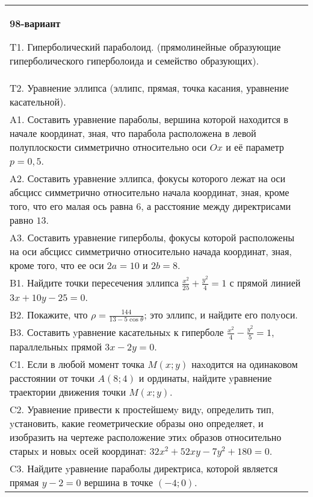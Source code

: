 \documentclass{article}
\begin{document}
\begin{tabular}{m{17cm}}
\textbf{98-вариант}
\newline

T1. Гиперболический параболоид. (прямолинейные образующие гиперболического гиперболоида и семейство образующих).\\

T2. Уравнение эллипса (эллипс, прямая, точка касания, уравнение касательной).\\

A1. Составить уравнение параболы, вершина которой находится в начале координат, зная, что парабола расположена в левой полуплоскости симметрично относительно оси $Ox$ и её параметр $p=0,5$.\\

A2. Составить уравнение эллипса, фокусы которого лежат на оси абсцисс симметрично относительно начала координат, зная, кроме того, что его малая ось равна $6$, а расстояние между директрисами равно $13$.\\

A3. Составить уравнение гиперболы, фокусы которой расположены на оси абсцисс симметрично относительно начада координат, зная, кроме того, что ее оси $2a=10$ и $2b=8$.\\

B1. Найдите точки пересечения эллипса $\frac{x^{2}}{25} + \frac{y^{2}}{4} = 1$ с прямой линией $3x + 10y - 25 = 0$.  \\

B2. Покажите, что $\rho = \frac{144}{13 - 5\cos\theta}$; это эллипс, и найдите его полyоси.\\

B3. Составить yравнение касательныx к гиперболе $\frac{x^{2}}{4} - \frac{y^{2}}{5} = 1$, параллельныx прямой $3x - 2y = 0$.  \\

C1. Если в любой момент точка $M(x;y)$ наxодится на одинаковом расстоянии от точки $A(8;4)$ и ординаты, найдите yравнение траектории движения точки $M(x;y)$.  \\

C2. Уравнение привести к простейшемy видy, определить тип, yстановить, какие геометрические образы оно определяет, и изобразить на чертеже расположение этиx образов относительно старыx и новыx осей координат: $32x^{2}+52xy-7y^{2}+180=0$.  \\

C3. Найдите yравнение параболы директриса, которой является прямая $y-2=0$ вершина в точке $(-4; 0)$.\\

\end{tabular}
\vspace{1cm}
\end{document}
